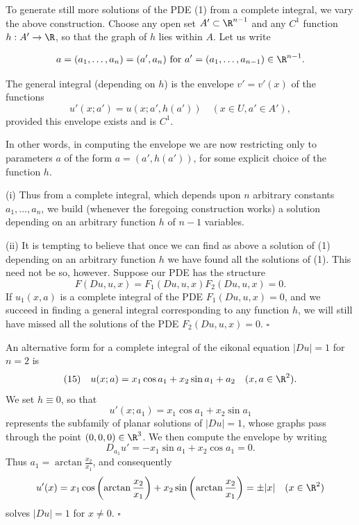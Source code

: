 To generate still more solutions of the PDE (1) from a complete integral, we vary the above construction. Choose any open set $A' \subset \R^{n-1}$ and any $C^1$ function $h : A' \to \R$, so that the graph of $h$ lies within $A$. Let us write

$$a = (a_1, \ldots, a_n) = (a', a_n) \text{ for } a' = (a_1, \ldots, a_{n-1}) \in \R^{n-1}.$$

\begin{definition}
\label{def:general-integral}
The general integral (depending on $h$) is the envelope $v' = v'(x)$ of the functions
$$u'(x;a') = u(x;a',h(a')) \quad (x \in U, a' \in A'),$$
provided this envelope exists and is $C^1$.

In other words, in computing the envelope we are now restricting only to parameters $a$ of the form $a = (a',h(a'))$, for some explicit choice of the function $h$.
\end{definition}

\begin{remark}
\label{rem:general-integral-remarks}
(i) Thus from a complete integral, which depends upon $n$ arbitrary constants $a_1,\ldots,a_n$, we build (whenever the foregoing construction works) a solution depending on an arbitrary function $h$ of $n - 1$ variables.

(ii) It is tempting to believe that once we can find as above a solution of (1) depending on an arbitrary function $h$ we have found all the solutions of (1). This need not be so, however. Suppose our PDE has the structure
$$F(Du, u, x) = F_1(Du, u, x)F_2(Du, u, x) = 0.$$
If $u_1(x, a)$ is a complete integral of the PDE $F_1(Du, u, x) = 0$, and we succeed in finding a general integral corresponding to any function $h$, we will still have missed all the solutions of the PDE $F_2(Du, u, x) = 0$. $\square$
\end{remark}

\begin{example}
\label{ex:eikonal-alternative-complete-integral}
An alternative form for a complete integral of the eikonal equation $|Du| = 1$ for $n = 2$ is
$$(15) \quad u(x; a) = x_1 \cos a_1 + x_2 \sin a_1 + a_2 \quad (x, a \in \R^2).$$
We set $h \equiv 0$, so that
$$u'(x; a_1) = x_1 \cos a_1 + x_2 \sin a_1$$
represents the subfamily of planar solutions of $|Du| = 1$, whose graphs pass through the point $(0, 0, 0) \in \R^3$. We then compute the envelope by writing
$$D_{a_1} u' = -x_1 \sin a_1 + x_2 \cos a_1 = 0.$$
Thus $a_1 = \arctan \frac{x_2}{x_1}$, and consequently
$$u'(x) = x_1 \cos\left(\arctan \frac{x_2}{x_1}\right) + x_2 \sin\left(\arctan \frac{x_2}{x_1}\right) = \pm|x| \quad (x \in \R^2)$$
solves $|Du| = 1$ for $x \neq 0$. $\square$
\end{example}

